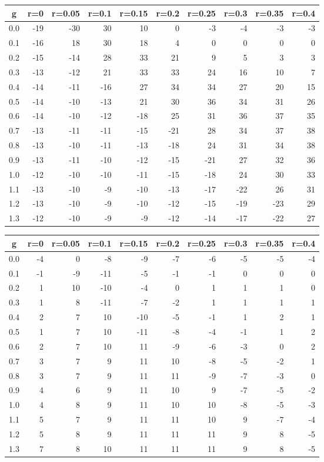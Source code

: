 %
\begin{table}[!tbp]
 \begin{center}
 \begin{tabular}{rrrrrrrrrr}\hline\hline
\multicolumn{1}{c}{g}&\multicolumn{1}{c}{r=0}&\multicolumn{1}{c}{r=0.05}&\multicolumn{1}{c}{r=0.1}&\multicolumn{1}{c}{r=0.15}&\multicolumn{1}{c}{r=0.2}&\multicolumn{1}{c}{r=0.25}&\multicolumn{1}{c}{r=0.3}&\multicolumn{1}{c}{r=0.35}&\multicolumn{1}{c}{r=0.4}\tabularnewline
\hline
0.0&-19&-30& 30& 10&  0& -3& -4& -3&-3\tabularnewline
0.1&-16& 18& 30& 18&  4&  0&  0&  0& 0\tabularnewline
0.2&-15&-14& 28& 33& 21&  9&  5&  3& 3\tabularnewline
0.3&-13&-12& 21& 33& 33& 24& 16& 10& 7\tabularnewline
0.4&-14&-11&-16& 27& 34& 34& 27& 20&15\tabularnewline
0.5&-14&-10&-13& 21& 30& 36& 34& 31&26\tabularnewline
0.6&-14&-10&-12&-18& 25& 31& 36& 37&35\tabularnewline
0.7&-13&-11&-11&-15&-21& 28& 34& 37&38\tabularnewline
0.8&-13&-10&-11&-13&-18& 24& 31& 34&38\tabularnewline
0.9&-13&-11&-10&-12&-15&-21& 27& 32&36\tabularnewline
1.0&-12&-10&-10&-11&-15&-18& 24& 30&33\tabularnewline
1.1&-13&-10& -9&-10&-13&-17&-22& 26&31\tabularnewline
1.2&-13&-10& -9&-10&-12&-15&-19&-23&29\tabularnewline
1.3&-12&-10& -9& -9&-12&-14&-17&-22&27\tabularnewline
\hline
\end{tabular}

\end{center}

\end{table}

%
\begin{table}[!tbp]
 \begin{center}
 \begin{tabular}{rrrrrrrrrr}\hline\hline
\multicolumn{1}{c}{g}&\multicolumn{1}{c}{r=0}&\multicolumn{1}{c}{r=0.05}&\multicolumn{1}{c}{r=0.1}&\multicolumn{1}{c}{r=0.15}&\multicolumn{1}{c}{r=0.2}&\multicolumn{1}{c}{r=0.25}&\multicolumn{1}{c}{r=0.3}&\multicolumn{1}{c}{r=0.35}&\multicolumn{1}{c}{r=0.4}\tabularnewline
\hline
0.0&-4& 0& -8& -9&-7&-6&-5&-5&-4\tabularnewline
0.1&-1&-9&-11& -5&-1&-1& 0& 0& 0\tabularnewline
0.2& 1&10&-10& -4& 0& 1& 1& 1& 0\tabularnewline
0.3& 1& 8&-11& -7&-2& 1& 1& 1& 1\tabularnewline
0.4& 2& 7& 10&-10&-5&-1& 1& 2& 1\tabularnewline
0.5& 1& 7& 10&-11&-8&-4&-1& 1& 2\tabularnewline
0.6& 2& 7& 10& 11&-9&-6&-3& 0& 2\tabularnewline
0.7& 3& 7&  9& 11&10&-8&-5&-2& 1\tabularnewline
0.8& 3& 7&  9& 11&11&-9&-7&-3& 0\tabularnewline
0.9& 4& 6&  9& 11&10& 9&-7&-5&-2\tabularnewline
1.0& 4& 8&  9& 11&10&10&-8&-5&-3\tabularnewline
1.1& 5& 7&  9& 11&11&10& 9&-7&-4\tabularnewline
1.2& 5& 8&  9& 11&11&11& 9& 8&-5\tabularnewline
1.3& 7& 8& 10& 11&11&11& 9& 8&-5\tabularnewline
\hline
\end{tabular}

\end{center}

\end{table}

